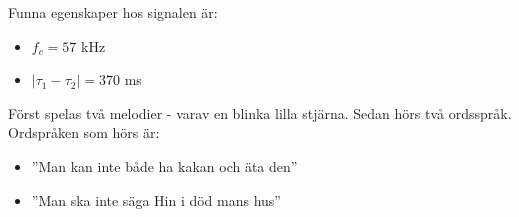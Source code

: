 \documentclass[10pt,twocolumn]{article}
\begin{document}
Funna egenskaper hos signalen är: 

\begin{itemize}
	\item $f_c = 57$ kHz
	\item $|\tau_1 - \tau_2| = 370$ ms
\end{itemize}

Först spelas två melodier - varav en blinka lilla stjärna. Sedan hörs två ordsspråk. Ordspråken som hörs är: 

\begin{itemize}
	\item ''Man kan inte både ha kakan och äta den''
	\item ''Man ska inte säga Hin i död mans hus''
\end{itemize}


\end{document}

